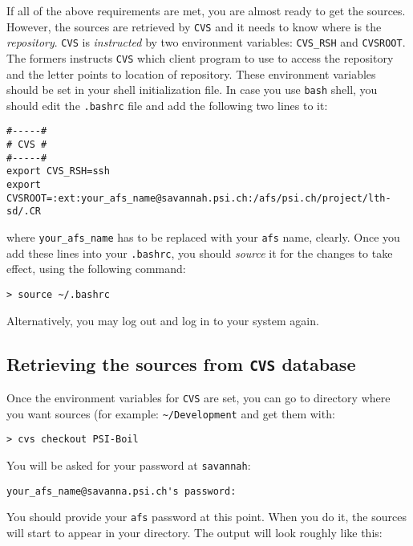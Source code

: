 If all of the above requirements are met, you are almost ready to get
the sources. However, the sources are retrieved by {\tt CVS} and it needs to
know where is the {\em repository}. {\tt CVS} is {\em instructed} by two 
environment variables: {\tt CVS\_RSH} and {\tt CVSROOT}. The formers instructs
{\tt CVS} which client program to use to access the repository and the letter
points to location of repository. These environment variables should be set 
in your shell initialization file. In case you use {\tt bash} shell, you should
edit the {\tt .bashrc} file and add the following two lines to it:

\begin{verbatim}
#-----#
# CVS #
#-----#
export CVS_RSH=ssh
export CVSROOT=:ext:your_afs_name@savannah.psi.ch:/afs/psi.ch/project/lth-sd/.CR
\end{verbatim}

where {\tt your\_afs\_name} has to be replaced with your {\tt afs} name, clearly. 
Once you add these lines into your {\tt .bashrc}, you should {\em source} it for 
the changes to take effect, using the following command:

\begin{verbatim}
> source ~/.bashrc
\end{verbatim}

Alternatively, you may log out and log in to your system again. 

\subsection{Retrieving the sources from {\tt CVS} database}

Once the environment variables for {\tt CVS} are set, you can go to directory
where you want {\psiboil} sources (for example: \verb"~"{\tt /Development} and get 
them with:
%
\begin{verbatim}
> cvs checkout PSI-Boil
\end{verbatim}
%
You will be asked for your password at {\tt savannah}:

\begin{verbatim}
your_afs_name@savanna.psi.ch's password:
\end{verbatim}

You should provide your {\tt afs} password at this point. When you do it, the
sources will start to appear in your directory. The output will look roughly 
like this:

